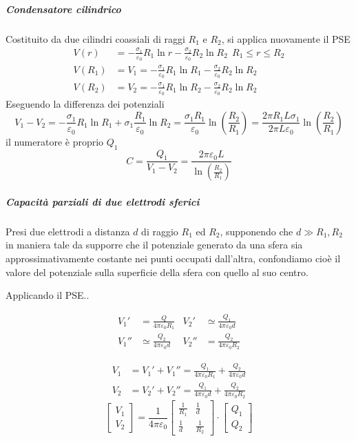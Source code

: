 \subparagraph{Condensatore cilindrico}
Costituito da due cilindri coassiali di raggi $R_1$ e $R_2$, si applica nuovamente il PSE
$$\begin{aligned}
V(r) &= -\frac{\sigma_1}{\varepsilon_0}R_1 \ln r - \frac{\sigma_2}{\varepsilon_0}R_2 \ln R_2\ \ R_1\leq r \leq R_2\\
V(R_1) &= V_1 = -\frac{\sigma_1}{\varepsilon_0} R_1 \ln R_1 - \frac{\sigma_2}{\varepsilon_0}R_2 \ln R_2\\
V(R_2) &= V_2 = -\frac{\sigma_1}{\varepsilon_0} R_1 \ln R_2 - \frac{\sigma_2}{\varepsilon_0}R_2 \ln R_2\end{aligned}
$$
Eseguendo la differenza dei potenziali
$$
V_1 - V_2 = -\frac{\sigma_1}{\varepsilon_0} R_1 \ln R_1 + \sigma_1\frac{R_1}{\varepsilon_0}\ln R_2
= \frac{\sigma_1 R_1}{\varepsilon_0}\ln\left(\frac{R_2}{R_1}\right) = \frac{2 \pi R_1 L \sigma_1}{2 \pi L \varepsilon_0}\ln \left(\frac{R_2}{R_1}\right)
$$
il numeratore è proprio $Q_1$
$$
C = \frac{Q_1}{V_1-V_2} = \frac{2 \pi \varepsilon_0 L }{\ln \left(\frac{R_2}{R_1}\right)}
$$

\subparagraph{Capacità parziali di due elettrodi sferici}
Presi due elettrodi a distanza $d$ di raggio $R_1$ ed $R_2$, supponendo che $d \gg R_1,R_2$
in maniera tale da supporre che il potenziale generato da una sfera sia approssimativamente
costante nei punti occupati dall'altra, confondiamo cioè il valore del potenziale sulla
superficie della sfera con quello al suo centro.

Applicando il PSE..

\begin{align*}
V_1' &= \frac{Q}{4 \pi \varepsilon_0 R_1}& V_2' &\simeq \frac{Q_1}{4 \pi \varepsilon_0 d}\\
V_1'' &\simeq \frac{Q_2}{4 \pi \varepsilon_0 d}& V_2'' &= \frac{Q_2}{4 \pi \varepsilon_0 R_2}
\end{align*}

$$
\begin{aligned}
V_1 &= V_1' + V_1'' = \frac{Q_1}{4\pi\varepsilon_0 R_1} + \frac{Q_2}{4 \pi \varepsilon_0 d} \\
V_2 &= V_2' + V_2'' = \frac{Q_1}{4\pi\varepsilon_0 d} + \frac{Q_2}{4 \pi \varepsilon_0 R_2}
\end{aligned}
$$
$$
\begin{bmatrix}
V_1 \\
V_2
\end{bmatrix} = \frac{1}{4\pi\varepsilon_0} \begin{bmatrix}
\frac{1}{R_1} & \frac{1}{d}\\
\frac{1}{d} & \frac{1}{R_2}
\end{bmatrix}\cdot
\begin{bmatrix}
Q_1\\
Q_2
\end{bmatrix}
$$
